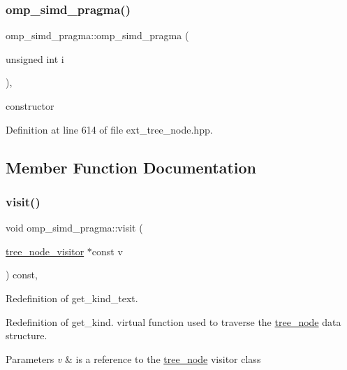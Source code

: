 \subsubsection{\texorpdfstring{omp\+\_\+simd\+\_\+pragma()}{omp\_simd\_pragma()}}
{\footnotesize\ttfamily omp\+\_\+simd\+\_\+pragma\+::omp\+\_\+simd\+\_\+pragma (\begin{DoxyParamCaption}\item[{unsigned int}]{i }\end{DoxyParamCaption})\hspace{0.3cm}{\ttfamily [inline]}, {\ttfamily [explicit]}}



constructor 



Definition at line 614 of file ext\+\_\+tree\+\_\+node.\+hpp.



\subsection{Member Function Documentation}
\mbox{\label{structomp__simd__pragma_aea58522f1cbf5637c63588430acf77f2}} 
\subsubsection{\texorpdfstring{visit()}{visit()}}
{\footnotesize\ttfamily void omp\+\_\+simd\+\_\+pragma\+::visit (\begin{DoxyParamCaption}\item[{\hyperlink{classtree__node__visitor}{tree\+\_\+node\+\_\+visitor} $\ast$const}]{v }\end{DoxyParamCaption}) const\hspace{0.3cm}{\ttfamily [override]}, {\ttfamily [virtual]}}



Redefinition of get\+\_\+kind\+\_\+text. 

Redefinition of get\+\_\+kind. virtual function used to traverse the \hyperlink{classtree__node}{tree\+\_\+node} data structure. 
\begin{DoxyParams}{Parameters}
{\em v} & is a reference to the \hyperlink{classtree__node}{tree\+\_\+node} visitor class \\
\hline
\end{DoxyParams}


